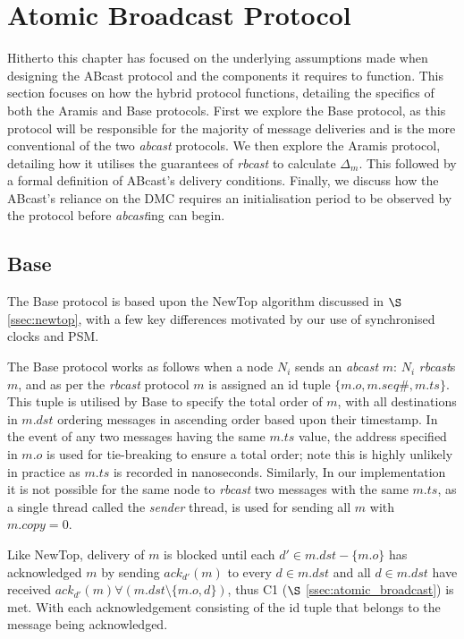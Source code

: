    
\clearpage
\section{Atomic Broadcast Protocol}\label{sec:ABcast}
Hitherto this chapter has focused on the underlying assumptions made when designing the \textsf{ABcast} protocol and the components it requires to function.  This section focuses on how the hybrid protocol functions, detailing the specifics of both the \textsf{Aramis} and \textsf{Base} protocols.  First we explore the \textsf{Base} protocol, as this protocol will be responsible for the majority of message deliveries and is the more conventional of the two \emph{abcast} protocols.  We then explore the \textsf{Aramis} protocol, detailing how it utilises the guarantees of \emph{rbcast} to calculate $\Delta_m$.   This followed by a formal definition of \textsf{ABcast}'s delivery conditions.  Finally, we discuss how the \textsf{ABcast}'s reliance on the DMC requires an initialisation period to be observed by the protocol before \emph{abcast}ing can begin.  

    \subsection{Base}
    The \textsf{Base} protocol is based upon the NewTop \citep{Ezhilchelvan:1995:NFG:876885.880005} algorithm discussed in $\S$ \ref{ssec:newtop}, with a few key differences motivated by our use of synchronised clocks and PSM.  
    
    The \textsf{Base} protocol works as follows when a node $N_i$ sends an \emph{abcast} $m$: $N_i$ \emph{rbcast}s $m$, and as per the \emph{rbcast} protocol $m$ is assigned an id tuple $\{m.o, m.seq\#, m.ts\}$.  This tuple is utilised by \textsf{Base} to specify the total order of $m$, with all destinations in $m.dst$ ordering messages in ascending order based upon their timestamp.  In the event of any two messages having the same $m.ts$ value, the address specified in $m.o$ is used for tie-breaking to ensure a total order; note this is highly unlikely in practice as $m.ts$ is recorded in nanoseconds.  Similarly, In our implementation it is not possible for the same node to \emph{rbcast} two messages with the same $m.ts$, as a single thread called the \emph{sender} thread, is used for sending all $m$ with $m.copy = 0$.  
    
    Like NewTop, delivery of $m$ is blocked until each $d' \in m.dst - \{m.o\}$ has acknowledged $m$ by sending $ack_{d'}(m)$ to every $d \in m.dst$ and all $d \in m.dst$ have received $ack_{d'}(m) \forall (m.dst \setminus \{m.o,d\})$, thus C1 ($\S$ \ref{ssec:atomic_broadcast}) is met.  With each acknowledgement consisting of the id tuple that belongs to the message being acknowledged.  
    
